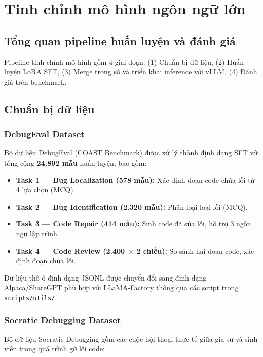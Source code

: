 \chapter{Tinh chỉnh mô hình ngôn ngữ lớn}
\label{chap:finetuning}

\section{Tổng quan pipeline huấn luyện và đánh giá}

Pipeline tinh chỉnh mô hình gồm 4 giai đoạn: (1) Chuẩn bị dữ liệu, (2) Huấn luyện LoRA SFT, (3) Merge trọng số và triển khai inference với vLLM, (4) Đánh giá trên benchmark.


\section{Chuẩn bị dữ liệu}

\subsection{DebugEval Dataset}

Bộ dữ liệu DebugEval (COAST Benchmark) được xử lý thành định dạng SFT với tổng cộng \textbf{24.892 mẫu} huấn luyện, bao gồm:

\begin{itemize}
    \item \textbf{Task 1 --- Bug Localization (578 mẫu):} Xác định đoạn code chứa lỗi từ 4 lựa chọn (MCQ).
    \item \textbf{Task 2 --- Bug Identification (2.320 mẫu):} Phân loại loại lỗi (MCQ).
    \item \textbf{Task 3 --- Code Repair (414 mẫu):} Sinh code đã sửa lỗi, hỗ trợ 3 ngôn ngữ lập trình.
    \item \textbf{Task 4 --- Code Review (2.400 × 2 chiều):} So sánh hai đoạn code, xác định đoạn chứa lỗi.
\end{itemize}

Dữ liệu thô ở định dạng JSONL được chuyển đổi sang định dạng Alpaca/ShareGPT phù hợp với LLaMA-Factory thông qua các script trong \texttt{scripts/utils/}.

\subsection{Socratic Debugging Dataset}

Bộ dữ liệu Socratic Debugging gồm các cuộc hội thoại thực tế giữa gia sư và sinh viên trong quá trình gỡ lỗi code:


